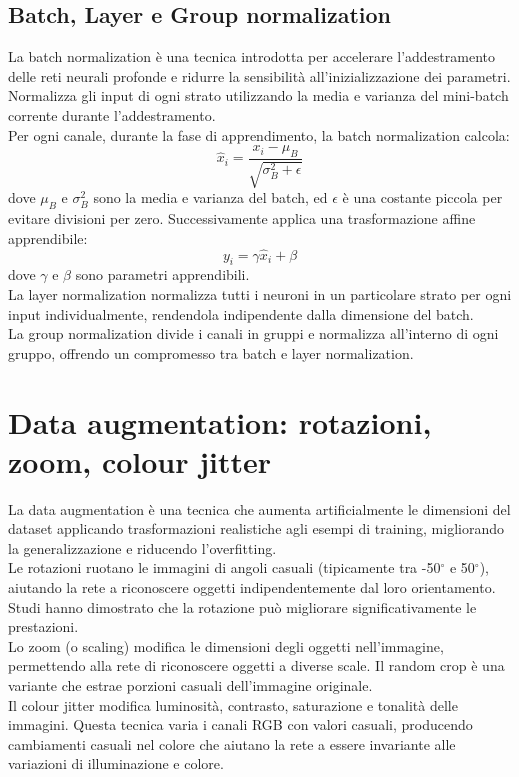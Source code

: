 \documentclass[a4paper,12pt]{report}
\begin{document}
	\subsection{Batch, Layer e Group normalization}
	La batch normalization è una tecnica introdotta per accelerare l'addestramento delle reti neurali profonde e ridurre la sensibilità all'inizializzazione dei parametri. Normalizza gli input di ogni strato utilizzando la media e varianza del mini-batch corrente durante l'addestramento. \\
	Per ogni canale, durante la fase di apprendimento, la batch normalization calcola:
	$$\hat{x}_i = \frac{x_i - \mu_B}{\sqrt{\sigma_B^2 + \epsilon}}$$
	dove $\mu_B$ e $\sigma_B^2$ sono la media e varianza del batch, ed $\epsilon$ è una costante piccola per evitare divisioni per zero. Successivamente applica una trasformazione affine apprendibile:
	$$y_i = \gamma \hat{x}_i + \beta$$
	dove $\gamma$ e $\beta$ sono parametri apprendibili. \\
	La layer normalization normalizza tutti i neuroni in un particolare strato per ogni input individualmente, rendendola indipendente dalla dimensione del batch. \\
	La group normalization divide i canali in gruppi e normalizza all'interno di ogni gruppo, offrendo un compromesso tra batch e layer normalization.
	
	\section{Data augmentation: rotazioni, zoom, colour jitter}
	La data augmentation è una tecnica che aumenta artificialmente le dimensioni del dataset applicando trasformazioni realistiche agli esempi di training, migliorando la generalizzazione e riducendo l'overfitting. \\
	Le rotazioni ruotano le immagini di angoli casuali (tipicamente tra -50$^\circ$ e 50$^\circ$), aiutando la rete a riconoscere oggetti indipendentemente dal loro orientamento. Studi hanno dimostrato che la rotazione può migliorare significativamente le prestazioni. \\
	Lo zoom (o scaling) modifica le dimensioni degli oggetti nell'immagine, permettendo alla rete di riconoscere oggetti a diverse scale. Il random crop è una variante che estrae porzioni casuali dell'immagine originale. \\
	Il colour jitter modifica luminosità, contrasto, saturazione e tonalità delle immagini. Questa tecnica varia i canali RGB con valori casuali, producendo cambiamenti casuali nel colore che aiutano la rete a essere invariante alle variazioni di illuminazione e colore.
	
\end{document}
